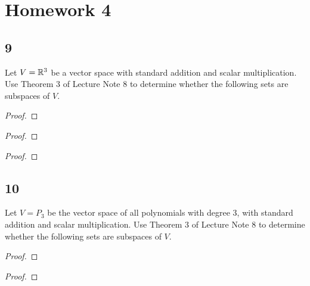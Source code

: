 





\section*{Homework 4}

\subsection*{9}
Let $V = \mathbb{R}^3$ be a vector space with standard addition and scalar multiplication. Use Theorem 3 of Lecture Note 8 to determine whether the following sets are subspaces of $V$.
\begin{enumerate}
  \begin{proof}

  \end{proof}
  \begin{proof}

  \end{proof}
  \begin{proof}

  \end{proof}
\end{enumerate}

\subsection*{10}
Let $V = P_3$ be the vector space of all polynomials with degree  3, with standard addition and scalar multiplication. Use Theorem 3 of Lecture Note 8 to determine whether the following sets are subspaces of $V$.
\begin{enumerate}
  \begin{proof}

  \end{proof}
  \begin{proof}

  \end{proof}
\end{enumerate}

